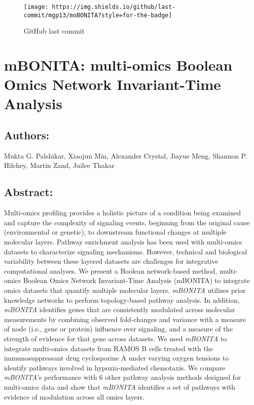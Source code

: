 \documentclass[]{article}
\date{}
\begin{document}
\begin{figure}
\centering
\texttt{[image: https://img.shields.io/github/last-commit/mgp13/moBONITA?style=for-the-badge]}
\caption{GitHub last commit}
\end{figure}

\hypertarget{mbonita-multi-omics-boolean-omics-network-invariant-time-analysis}{%
\section{mBONITA: multi-omics Boolean Omics Network Invariant-Time
Analysis}\label{mbonita-multi-omics-boolean-omics-network-invariant-time-analysis}}

\hypertarget{authors}{%
\subsection{Authors:}\label{authors}}

Mukta G. Palshikar, Xiaojun Min, Alexander Crystal, Jiayue Meng, Shannon
P. Hilchey, Martin Zand, Juilee Thakar

\hypertarget{abstract}{%
\subsection{Abstract:}\label{abstract}}

Multi-omics profiling provides a holistic picture of a condition being
examined and capture the complexity of signaling events, beginning from
the original cause (environmental or genetic), to downstream functional
changes at multiple molecular layers. Pathway enrichment analysis has
been used with multi-omics datasets to characterize signaling
mechanisms. However, technical and biological variability between these
layered datasets are challenges for integrative computational analyses.
We present a Boolean network-based method, multi-omics Boolean Omics
Network Invariant-Time Analysis (mBONITA) to integrate omics datasets
that quantify multiple molecular layers. \emph{mBONITA} utilizes prior
knowledge networks to perform topology-based pathway analysis. In
addition, \emph{mBONITA} identifies genes that are consistently
modulated across molecular measurements by combining observed
fold-changes and variance with a measure of node (i.e., gene or protein)
influence over signaling, and a measure of the strength of evidence for
that gene across datasets. We used \emph{mBONITA} to integrate
multi-omics datasets from RAMOS B cells treated with the
immunosuppressant drug cyclosporine A under varying oxygen tensions to
identify pathways involved in hypoxia-mediated chemotaxis. We compare
\emph{mBONITA}'s performance with 6 other pathway analysis methods
designed for multi-omics data and show that \emph{mBONITA} identifies a
set of pathways with evidence of modulation across all omics layers.
\end{document}
